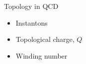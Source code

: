 \documentclass[10pt,show notes on second screen]{beamer}
\begin{document}

\begin{frame}{Topology in QCD}
\begin{itemize}
    \item <1->Instantons
    \item <2->Topological charge, $Q$
    \item <3->Winding number
\end{itemize}


\end{frame}
\end{document}
